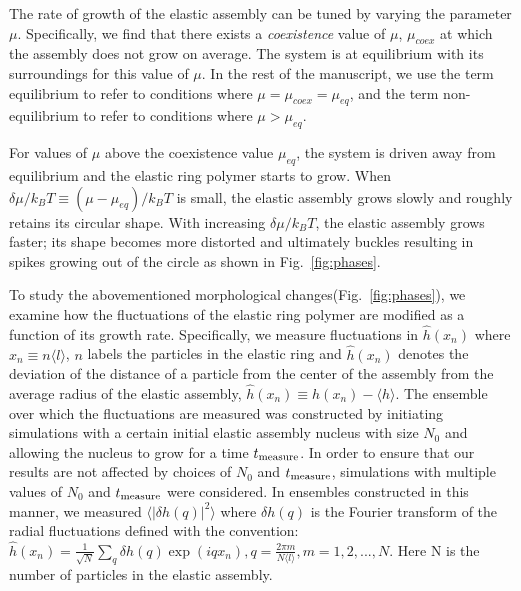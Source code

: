 \documentclass[amsmath,preprintnumbers,10pt,nofootinbib,prl,twocolumn]{revtex4-1}
\begin{document}
The rate of growth of the elastic assembly can be tuned by varying the parameter $\mu$. Specifically, we find that there exists a \textit{coexistence} value of $\mu$, $\mu_{coex}$ at which the assembly does not grow on average. The system is at equilibrium with its surroundings for this value of $\mu$. In the rest of the manuscript, we use the term equilibrium to refer to conditions where $\mu =\mu_{coex}=\mu_{eq}$, and the term non-equilibrium to refer to conditions where $\mu > \mu_{eq}$. 

For values of $\mu$ above the coexistence value $\mu_{eq}$, the system is driven away from equilibrium and the elastic ring polymer starts to grow. When $\delta\mu/k_BT \equiv (\mu-\mu_{eq})/k_B T$ is small, the elastic assembly grows slowly and roughly retains its circular shape. With increasing $\delta\mu/k_B T$, the elastic assembly grows faster; its shape becomes more distorted and ultimately buckles resulting in spikes growing out of the circle as shown in Fig.~\ref{fig:phases}. 

To study the abovementioned morphological changes(Fig.~\ref{fig:phases}), we examine how the fluctuations of the elastic ring polymer are modified as a function of its growth rate. Specifically, we measure fluctuations in $\hat{h}(x_n)$ where $x_n\equiv n\langle l \rangle$, $n$ labels the particles in the elastic ring and $\hat{h}(x_n)$ denotes the deviation of the distance of a particle from the center of the assembly from the average radius of the elastic assembly, $\hat{h}(x_n)\equiv h(x_n) -\langle h \rangle$. The ensemble over which the fluctuations are measured was constructed by initiating simulations with a certain initial elastic assembly nucleus with size $N_0$ and allowing the nucleus to grow for a time $t_{\rm measure}$. In order to ensure that our results are not affected by choices of $N_0$ and $t_{\rm measure}$, simulations with multiple values of $N_0$ and $t_{\rm measure}$ were considered. In ensembles constructed in this manner, we measured $\langle |\delta h(q)|^2 \rangle$ where $\delta h(q)$ is the Fourier transform of the radial fluctuations defined with the convention: $\hat{h}(x_n)=\frac{1}{\sqrt{N}}\sum _q \delta h(q) \exp(iqx_n), q = \frac{2\pi m}{N\langle l \rangle}, m = 1, 2,...,N$. Here N is the number of particles in the elastic assembly. 
\end{document}
